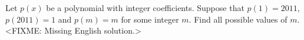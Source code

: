 \problem
Let $p(x)$ be a polynomial with integer coefficients.
Suppose that $p(1) = 2011$, $p(2011) = 1$ and $p(m) = m$ for some integer $m$.
Find all possible values of $m$.
\solution
<FIXME: Missing English solution.>
\endproblem
